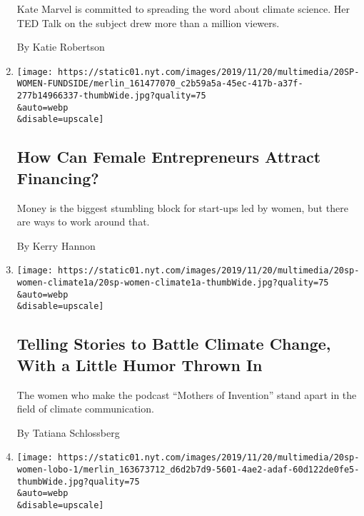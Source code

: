 \begin{enumerate}
  Kate Marvel is committed to spreading the word about climate science.
  Her TED Talk on the subject drew more than a million viewers.

  By Katie Robertson
\item
  \href{/2019/11/19/business/women-entrepreneurs.html}{}

  \texttt{[image: https://static01.nyt.com/images/2019/11/20/multimedia/20SP-WOMEN-FUNDSIDE/merlin\_161477070\_c2b59a5a-45ec-417b-a37f-277b14966337-thumbWide.jpg?quality=75\\\&auto=webp\\\&disable=upscale]}

  \hypertarget{how-can-female-entrepreneurs-attract-financing}{%
  \subsection{How Can Female Entrepreneurs Attract
  Financing?}\label{how-can-female-entrepreneurs-attract-financing}}

  Money is the biggest stumbling block for start-ups led by women, but
  there are ways to work around that.

  By Kerry Hannon
\item
  \href{/2019/11/10/climate/mary-robinson-maeve-higgins-thimali-kodikara-podcast.html}{}

  \texttt{[image: https://static01.nyt.com/images/2019/11/20/multimedia/20sp-women-climate1a/20sp-women-climate1a-thumbWide.jpg?quality=75\\\&auto=webp\\\&disable=upscale]}

  \hypertarget{telling-stories-to-battle-climate-change-with-a-little-humor-thrown-in}{%
  \subsection{Telling Stories to Battle Climate Change, With a Little
  Humor Thrown
  In}\label{telling-stories-to-battle-climate-change-with-a-little-humor-thrown-in}}

  The women who make the podcast ``Mothers of Invention'' stand apart in
  the field of climate communication.

  By Tatiana Schlossberg
\item
  \href{/2019/11/10/climate/gillian-lobo-environmental-law.html}{}

  \texttt{[image: https://static01.nyt.com/images/2019/11/20/multimedia/20sp-women-lobo-1/merlin\_163673712\_d6d2b7d9-5601-4ae2-adaf-60d122de0fe5-thumbWide.jpg?quality=75\\\&auto=webp\\\&disable=upscale]}

  \hypertarget{a-legal-approach-to-fighting-climate-change}{%
}
\end{enumerate}
